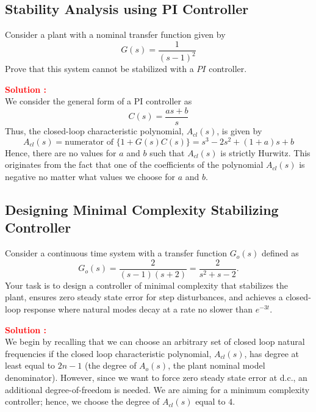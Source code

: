\documentclass[12pt]{article}
\begin{document}
\subsection{Stability Analysis using PI Controller}

Consider a plant with a nominal transfer function given by
\begin{equation}
G(s) = \frac{1}{(s - 1)^2}
\end{equation}
Prove that this system cannot be stabilized with a \(PI\) controller.

\textbf{\textcolor{red}{Solution :}} \\ 
We consider the general form of a PI controller as
\begin{equation}
C(s) = \frac{as + b}{s}
\end{equation}
Thus, the closed-loop characteristic polynomial, \(A_{cl}(s)\), is given by
\begin{equation}
A_{cl}(s) = \text{numerator of } \{1 + G(s)C(s)\} = s^3 - 2s^2 + (1 + a)s + b
\end{equation}
Hence, there are no values for \(a\) and \(b\) such that \(A_{cl}(s)\) is strictly Hurwitz. This originates from the fact that one of the coefficients of the polynomial \(A_{cl}(s)\) is negative no matter what values we choose for \(a\) and \(b\).
\clearpage

\subsection{Designing Minimal Complexity Stabilizing Controller}
Consider a continuous time system with a transfer function \(G_o(s)\) defined as
\begin{equation}
G_o(s) = \frac{2}{(s - 1)(s + 2)} = \frac{2}{s^2 + s - 2}.
\end{equation}
Your task is to design a controller of minimal complexity that stabilizes the plant, ensures zero steady state error for step disturbances, and achieves a closed-loop response where natural modes decay at a rate no slower than \(e^{-3t}\).

\textbf{\textcolor{red}{Solution :}} \\ 
We begin by recalling that we can choose an arbitrary set of closed loop natural frequencies if the closed loop characteristic polynomial, $A_{cl}(s)$, has degree at least equal to $2n-1$ (the degree of $A_o(s)$, the plant nominal model denominator). However, since we want to force zero steady state error at d.c., an additional degree-of-freedom is needed. We are aiming for a minimum complexity controller; hence, we choose the degree of $A_{cl}(s)$ equal to $4$.
\end{document}
